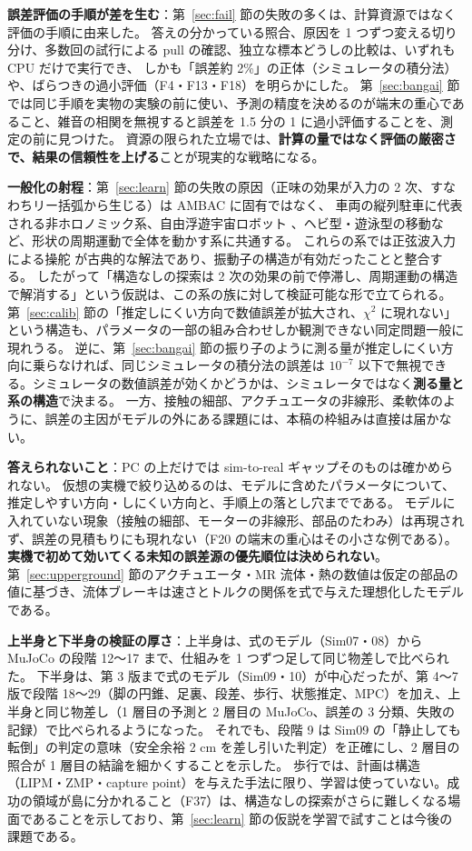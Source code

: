 \documentclass[paper=a4paper,fontsize=10pt,twocolumn,column_gap=2zw,line_length=24zw,number_of_lines=46,head_space=20mm]{jlreq}
\begin{document}
\textbf{誤差評価の手順が差を生む}：第~\ref{sec:fail} 節の失敗の多くは、計算資源ではなく評価の手順に由来した。
答えの分かっている照合、原因を 1 つずつ変える切り分け、多数回の試行による pull の確認、独立な標本どうしの比較は、いずれも CPU だけで実行でき、
しかも「誤差約 2\%」の正体（シミュレータの積分法）や、ばらつきの過小評価（F4・F13・F18）を明らかにした。
第~\ref{sec:bangai} 節では同じ手順を実物の実験の前に使い、予測の精度を決めるのが端末の重心であること、雑音の相関を無視すると誤差を 1.5 分の 1 に過小評価することを、測定の前に見つけた。
資源の限られた立場では、\textbf{計算の量ではなく評価の厳密さで、結果の信頼性を上げる}ことが現実的な戦略になる。

\textbf{一般化の射程}：第~\ref{sec:learn} 節の失敗の原因（正味の効果が入力の 2 次、すなわちリー括弧から生じる）は AMBAC に固有ではなく、
車両の縦列駐車に代表される非ホロノミック系、自由浮遊宇宙ロボット \cite{nakamura1991}、ヘビ型・遊泳型の移動など、形状の周期運動で全体を動かす系に共通する。
これらの系では正弦波入力による操舵 \cite{murray1993} が古典的な解法であり、振動子の構造が有効だったことと整合する。
したがって「構造なしの探索は 2 次の効果の前で停滞し、周期運動の構造で解消する」という仮説は、この系の族に対して検証可能な形で立てられる。
第~\ref{sec:calib} 節の「推定しにくい方向で数値誤差が拡大され、$\chi^2$ に現れない」という構造も、パラメータの一部の組み合わせしか観測できない同定問題一般に現れうる。
逆に、第~\ref{sec:bangai} 節の振り子のように測る量が推定しにくい方向に乗らなければ、同じシミュレータの積分法の誤差は $10^{-7}$ 以下で無視できる。シミュレータの数値誤差が効くかどうかは、シミュレータではなく\textbf{測る量と系の構造}で決まる。
一方、接触の細部、アクチュエータの非線形、柔軟体のように、誤差の主因がモデルの外にある課題には、本稿の枠組みは直接は届かない。

\textbf{答えられないこと}：PC の上だけでは sim-to-real ギャップそのものは確かめられない。
仮想の実機で絞り込めるのは、モデルに含めたパラメータについて、推定しやすい方向・しにくい方向と、手順上の落とし穴までである。
モデルに入れていない現象（接触の細部、モーターの非線形、部品のたわみ）は再現されず、誤差の見積もりにも現れない（F20 の端末の重心はその小さな例である）。\textbf{実機で初めて効いてくる未知の誤差源の優先順位は決められない}。
第~\ref{sec:upperground} 節のアクチュエータ・MR 流体・熱の数値は仮定の部品の値に基づき、流体ブレーキは速さとトルクの関係を式で与えた理想化したモデルである。

\textbf{上半身と下半身の検証の厚さ}：上半身は、式のモデル（Sim07・08）から MuJoCo の段階 12〜17 まで、仕組みを 1 つずつ足して同じ物差しで比べられた。
下半身は、第 3 版まで式のモデル（Sim09・10）が中心だったが、第 4〜7 版で段階 18〜29（脚の円錐、足裏、段差、歩行、状態推定、MPC）を加え、上半身と同じ物差し（1 層目の予測と 2 層目の MuJoCo、誤差の 3 分類、失敗の記録）で比べられるようになった。
それでも、段階 9 は Sim09 の「静止しても転倒」の判定の意味（安全余裕 2 cm を差し引いた判定）を正確にし、2 層目の照合が 1 層目の結論を細かくすることを示した。
歩行では、計画は構造（LIPM・ZMP・capture point）を与えた手法に限り、学習は使っていない。成功の領域が島に分かれること（F37）は、構造なしの探索がさらに難しくなる場面であることを示しており、第~\ref{sec:learn} 節の仮説を学習で試すことは今後の課題である。
\end{document}
